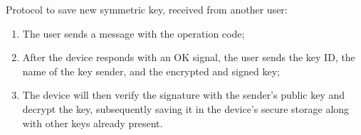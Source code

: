 Protocol to save new symmetric key, received from another user:
\begin{enumerate}
    \item The user sends a message with the operation code;
    \item After the device responds with an OK signal, the user sends the key ID, the name of the key sender, and the encrypted and signed key;
    \item The device will then verify the signature with the sender's public key and decrypt the key, subsequently saving it in the device's secure storage along with other keys already present.
\end{enumerate}
